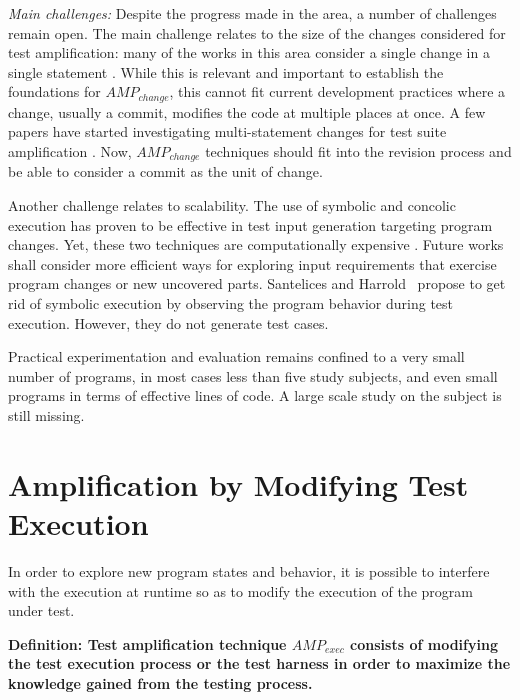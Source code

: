 \emph{Main challenges:}
Despite the progress made in the area, a number of challenges remain open. 
The main challenge relates to the size of the changes considered for test amplification: many of the works in this area consider a single change in a single statement \cite{apiwattanapong2006matrix,qi2010test,xwang2014directed}. 
While this is relevant and important to establish the foundations for $AMP_{change}$, this cannot fit current development practices where a change, usually a commit, modifies the code at multiple places at once. 
A few papers have started investigating multi-statement changes for test suite amplification \cite{santelices2008test,marinescu2013katch,palikareva2016shadow}. 
Now, $AMP_{change}$ techniques should fit into the revision process and be able to consider a commit as the unit of change. 

Another challenge relates to scalability. 
The use of symbolic and concolic execution has proven to be effective in test input generation targeting program changes. 
Yet, these two techniques are computationally expensive \cite{xu2009directed,xu2011hybrid,xu2015directed,apiwattanapong2006matrix,santelices2008test,palikareva2016shadow}. 
Future works shall consider more efficient ways for exploring input requirements that  exercise program changes or new uncovered parts. 
Santelices and Harrold~\cite{santelices2011applying} propose to get rid of symbolic execution by observing the program behavior during test execution. 
However, they do not generate test cases.

Practical experimentation and evaluation remains confined to a very small number of programs, in most cases less than five study subjects, and even small programs in terms of effective lines of code. 
A large scale study on the subject is still missing.

\section{Amplification by Modifying Test Execution}
\label{sec:sota:category-3}

In order to explore new program states and behavior, it is possible to interfere with the execution at runtime so as to modify the execution of the program under test. 

\medskip
\textbf{Definition: Test amplification technique $AMP_{exec}$ consists of modifying the test execution process or the test harness in order to maximize the knowledge gained from the testing process.}

